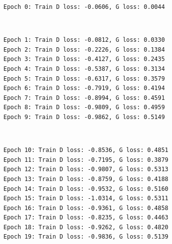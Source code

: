 \documentclass[11pt]{article}
\begin{document}
    \begin{Verbatim}[commandchars=\\\{\}]
Epoch 0: Train D loss: -0.0606, G loss: 0.0044

    \end{Verbatim}

    \begin{center}
    \end{center}
    { \hspace*{\fill} \\}
    
    \begin{Verbatim}[commandchars=\\\{\}]
Epoch 1: Train D loss: -0.0812, G loss: 0.0330
Epoch 2: Train D loss: -0.2226, G loss: 0.1384
Epoch 3: Train D loss: -0.4127, G loss: 0.2435
Epoch 4: Train D loss: -0.5387, G loss: 0.3134
Epoch 5: Train D loss: -0.6317, G loss: 0.3579
Epoch 6: Train D loss: -0.7919, G loss: 0.4194
Epoch 7: Train D loss: -0.8994, G loss: 0.4591
Epoch 8: Train D loss: -0.9809, G loss: 0.4959
Epoch 9: Train D loss: -0.9862, G loss: 0.5149

    \end{Verbatim}

    \begin{center}
    \end{center}
    { \hspace*{\fill} \\}
    
    \begin{Verbatim}[commandchars=\\\{\}]
Epoch 10: Train D loss: -0.8536, G loss: 0.4851
Epoch 11: Train D loss: -0.7195, G loss: 0.3879
Epoch 12: Train D loss: -0.9807, G loss: 0.5313
Epoch 13: Train D loss: -0.8759, G loss: 0.4188
Epoch 14: Train D loss: -0.9532, G loss: 0.5160
Epoch 15: Train D loss: -1.0314, G loss: 0.5311
Epoch 16: Train D loss: -0.9361, G loss: 0.4858
Epoch 17: Train D loss: -0.8235, G loss: 0.4463
Epoch 18: Train D loss: -0.9262, G loss: 0.4820
Epoch 19: Train D loss: -0.9836, G loss: 0.5139

    \end{Verbatim}

    \begin{center}
    \end{center}
    { \hspace*{\fill} \\}
    
\end{document}
